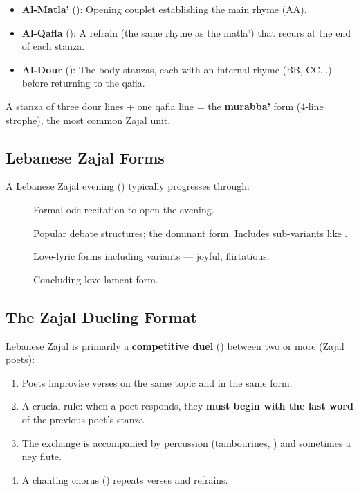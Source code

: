 \begin{itemize}
  \item \textbf{Al-Matla'} (): Opening couplet establishing the main rhyme (AA).
  \item \textbf{Al-Qafla} (): A refrain (the same rhyme as the matla') that recurs at the end of each stanza.
  \item \textbf{Al-Dour} (): The body stanzas, each with an internal rhyme (BB, CC...) before returning to the qafla.
\end{itemize}

A stanza of three dour lines + one qafla line = the \textbf{murabba'} form (4-line strophe), the most common Zajal unit.

\subsection{Lebanese Zajal Forms}

A Lebanese Zajal evening () typically progresses through:
\begin{description}
  \item[] Formal ode recitation to open the evening.
  \item[] Popular debate structures; the dominant form. Includes sub-variants like .
  \item[] Love-lyric forms including  variants — joyful, flirtatious.
  \item[] Concluding love-lament form.
\end{description}

\subsection{The Zajal Dueling Format}

Lebanese Zajal is primarily a \textbf{competitive duel} () between two or more  (Zajal poets):
\begin{enumerate}
  \item Poets improvise verses on the same topic and in the same form.
  \item A crucial rule: when a poet responds, they \textbf{must begin with the last word} of the previous poet's stanza.
  \item The exchange is accompanied by percussion (tambourines, ) and sometimes a ney flute.
  \item A chanting chorus () repeats verses and refrains.
\end{enumerate}

